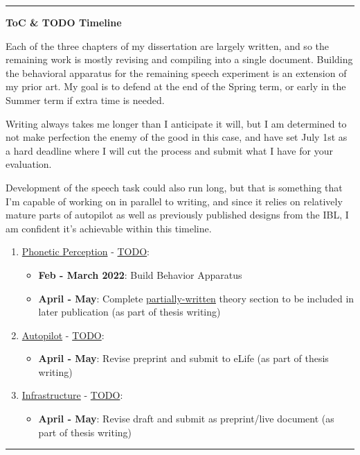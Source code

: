 
\vspace{1em}
\hrule
\vspace{1em}

\textbf{ToC \& TODO Timeline}

Each of the three chapters of my dissertation are largely written, and so the remaining work is mostly revising and compiling into a single document. Building the behavioral apparatus for the remaining speech experiment is an extension of my prior art. My goal is to defend at the end of the Spring term, or early in the Summer term if extra time is needed.

Writing always takes me longer than I anticipate it will, but I am determined to not make perfection the enemy of the good in this case, and have set July 1st as a hard deadline where I will cut the process and submit what I have for your evaluation.

Development of the speech task could also run long, but that is something that I'm capable of working on in parallel to writing, and since it relies on relatively mature parts of autopilot as well as previously published designs from the IBL\cite{laboratoryStandardizedReproducibleMeasurement2020a}, I am confident it's achievable within this timeline.

\begin{enumerate}
\item \hyperref[sec:phonemes]{Phonetic Perception} - \hyperref[todo:speech]{TODO}:

	\begin{itemize}
	\item \textbf{Feb - March 2022}: Build Behavior Apparatus
	\item \textbf{April - May}: Complete \href{https://github.com/sneakers-the-rat/prelims/}{partially-written} theory section to be included in later publication (as part of thesis writing)
	\end{itemize}

\item \hyperref[sec:autopilot]{Autopilot} - \hyperref[todo:autopilot]{TODO}:

	\begin{itemize}
	\item \textbf{April - May}: Revise preprint and submit to eLife (as part of thesis writing)
	\end{itemize}

\item \hyperref[sec:infrastructure]{Infrastructure} - \hyperref[todo:infrastructure]{TODO}: 

	\begin{itemize}
	\item \textbf{April - May}: Revise draft and submit as preprint/live document (as part of thesis writing)
	\end{itemize}
\end{enumerate}




\vspace{1em}

\hrule